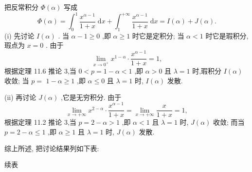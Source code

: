 \begin{solution}

\end{solution}
把反常积分 \(\Phi \left( \alpha \right)\) 写成
\[
\Phi \left( \alpha \right)  = {\int }_{0}^{1}\frac{{x}^{\alpha  - 1}}{1 + x}\mathrm{\;d}x + {\int }_{1}^{+\infty }\frac{{x}^{\alpha  - 1}}{1 + x}\mathrm{\;d}x = I\left( \alpha \right)  + J\left( \alpha \right) .
\]
(i) 先讨论 \(I\left( \alpha \right)\) . 当 \(\alpha  - 1 \geq  0\) ,即 \(\alpha  \geq  1\) 时它是定积分; 当 \(\alpha  < 1\) 时它是瑕积分,瑕点为 \(x = 0\) . 由于
\[
\mathop{\lim }\limits_{{x \rightarrow  {0}^{ + }}}{x}^{1 - \alpha } \cdot  \frac{{x}^{\alpha  - 1}}{1 + x} = 1,
\]
根据定理 11.6 推论 3,当 \(0 < p = 1 - \alpha  < 1\) ,即 \(\alpha  > 0\) 且 \(\lambda  = 1\) 时,瑕积分 \(I\left( \alpha \right)\) 收敛; 当 \(p =\)  \(1 - \alpha  \geq  1\) ,即 \(\alpha  \leq  0\) 且 \(\lambda  = 1\) 时, \(I\left( \alpha \right)\) 发散.

(ii) 再讨论 \(J\left( \alpha \right)\) ,它是无穷积分. 由于
\[
\mathop{\lim }\limits_{{x \rightarrow   + \infty }}{x}^{2 - \alpha } \cdot  \frac{{x}^{\alpha  - 1}}{1 + x} = \mathop{\lim }\limits_{{x \rightarrow   + \infty }}\frac{x}{1 + x} = 1,
\]
根据定理 11.2 推论 3,当 \(p = 2 - \alpha  > 1\) ,即 \(\alpha  < 1\) 且 \(\lambda  = 1\) 时, \(J\left( \alpha \right)\) 收敛; 而当 \(p = 2 - \alpha  \leq  1\) ,即 \(\alpha  \geq  1\) 且 \(\lambda  = 1\) 时, \(J\left( \alpha \right)\) 发散.

综上所述, 把讨论结果列如下表:

\begin{center}
\end{center}

续表

\begin{center}
\end{center}

